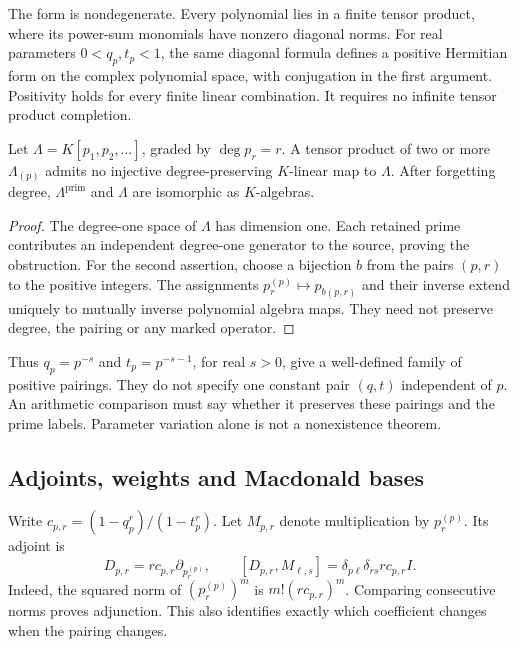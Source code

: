 The form is nondegenerate. Every polynomial lies in a finite tensor
product, where its power-sum monomials have nonzero diagonal norms.
For real parameters $0<q_p,t_p<1$, the same diagonal formula
defines a positive Hermitian form on the complex polynomial space,
with conjugation in the first argument. Positivity holds for every finite linear combination. It
requires no infinite tensor product completion.

\begin{proposition}\label{v4-arith:obs:domain-mismatch-macdonald}
Let $\Lambda=K[p_1,p_2,\ldots]$, graded by $\deg p_r=r$.
A tensor product of two or more $\Lambda_{(p)}$ admits no
injective degree-preserving $K$-linear map to $\Lambda$.
After forgetting degree, $\Lambda^{\mathrm{prim}}$ and $\Lambda$
are isomorphic as $K$-algebras.
\end{proposition}
\begin{proof}
The degree-one space of $\Lambda$ has dimension one. Each retained
prime contributes an independent degree-one generator to the
source, proving the obstruction. For the second assertion, choose
a bijection $b$ from the pairs $(p,r)$ to the positive integers.
The assignments $p_r^{(p)}\mapsto p_{b(p,r)}$ and their inverse
extend uniquely to mutually inverse polynomial algebra maps.
They need not preserve degree, the pairing or any marked operator.
\end{proof}

Thus $q_p=p^{-s}$ and $t_p=p^{-s-1}$, for real $s>0$, give a
well-defined family of positive pairings. They do not specify one
constant pair $(q,t)$ independent of $p$. An arithmetic comparison
must say whether it preserves these pairings and the prime labels.
Parameter variation alone is not a nonexistence theorem.

\subsection{Adjoints, weights and Macdonald bases}
\label{v4-arith:et:logp-not-in-qt}

Write $c_{p,r}=(1-q_p^r)/(1-t_p^r)$. Let $M_{p,r}$ denote
multiplication by $p_r^{(p)}$. Its adjoint is
\[
 D_{p,r}=r c_{p,r}\partial_{p_r^{(p)}},\qquad
 [D_{p,r},M_{\ell,s}]
 =\delta_{p\ell}\delta_{rs}r c_{p,r}I.
\]
Indeed, the squared norm of $(p_r^{(p)})^m$ is
$m!(r c_{p,r})^m$. Comparing consecutive norms proves adjunction.
This also identifies exactly which coefficient changes when the
pairing changes.

